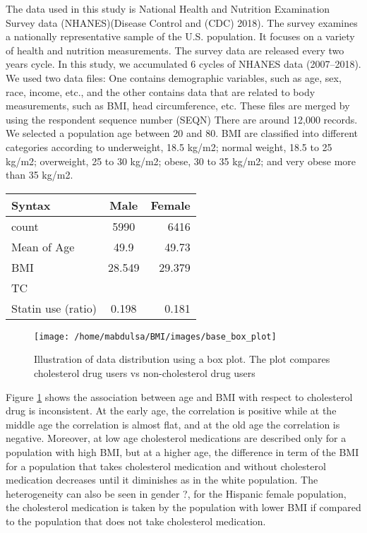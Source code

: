 \documentclass[
  12pt,
]{article}
\begin{document}
The data used in this study is National Health and Nutrition Examination Survey data (NHANES)(Disease Control and (CDC) 2018). The survey examines a nationally representative sample of the U.S. population. It focuses on a variety of health and nutrition measurements. The survey data are released every two years cycle. In this study, we accumulated 6 cycles of NHANES data (2007--2018). We used two data files: One contains demographic variables, such as age, sex, race, income, etc., and the other contains data that are related to body measurements, such as BMI, head circumference, etc. These files are merged by using the respondent sequence number (SEQN)
There are around 12,000 records. We selected a population age between 20 and 80.
BMI are classified into different categories according to underweight, 18.5 kg/m2; normal weight, 18.5 to 25 kg/m2; overweight, 25 to 30 kg/m2; obese, 30 to 35 kg/m2; and very obese more than 35 kg/m2.

\begin{longtable}[]{@{}lcr@{}}
\toprule
Syntax & Male & Female\tabularnewline
\midrule
\endhead
count & 5990 & 6416\tabularnewline
Mean of Age & 49.9 & 49.73\tabularnewline
BMI & 28.549 & 29.379\tabularnewline
TC & &\tabularnewline
Statin use (ratio) & 0.198 & 0.181\tabularnewline
\bottomrule
\end{longtable}

\begin{figure}

{\centering \texttt{[image: /home/mabdulsa/BMI/images/base\_box\_plot]} 

}

\caption{Illustration of data distribution using a box plot. The plot compares cholesterol drug users vs non-cholesterol drug users}\label{fig:box}
\end{figure}

Figure \ref{fig:box} shows the association between age and BMI with respect to cholesterol drug is inconsistent. At the early age, the correlation is positive while at the middle age the correlation is almost flat, and at the old age the correlation is negative. Moreover, at low age cholesterol medications are described only for a population with high BMI, but at a higher age, the difference in term of the BMI for a population that takes cholesterol medication and without cholesterol medication decreases until it diminishes as in the white population. The heterogeneity can also be seen in gender ?, for the Hispanic female population, the cholesterol medication is taken by the population with lower BMI if compared to the population that does not take cholesterol medication.
\end{document}
